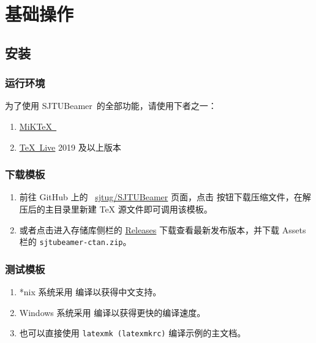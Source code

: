 \documentclass[
    UTF8,
    heading=true,
    12pt,
    a4paper
]{ctexrep}
\def\themename{\textsf{SJTUBeamer}}
\begin{document}
    \part{基础操作}
    \chapter{安装}

    \section{运行环境}

    为了使用 \themename\ 的全部功能，请使用下者之一：
    \begin{enumerate}
        \item \href{https://miktex.org/}{MiK\TeX\ }
        \item \href{https://mirrors.sjtug.sjtu.edu.cn/ctan/systems/texlive/Images/texlive2021-20210325.iso}{\TeX\ Live} 2019 及以上版本
    \end{enumerate}

    \section{下载模板}

    \begin{enumerate}
        \item 前往 GitHub 上的 \faGithub{}~\href{https://github.com/sjtug/SJTUBeamer}{sjtug/SJTUBeamer} 页面，点击  按钮下载压缩文件，在解压后的主目录里新建 \TeX{} 源文件即可调用该模板。
        \item 或者点击进入存储库侧栏的 \href{https://github.com/sjtug/SJTUBeamer/releases}{\textsf{Releases}} 下载查看最新发布版本，并下载 \textsf{Assets} 栏的 \texttt{sjtubeamer-ctan.zip}。
    \end{enumerate}
    
    \section{测试模板}

    \begin{enumerate}
        \item[ \faApple\ \faLinux] *nix 系统采用  编译以获得中文支持。
        \item[ \faWindows] Windows 系统采用  编译以获得更快的编译速度。
        \item[\faWrench] 也可以直接使用 \texttt{latexmk (latexmkrc)} 编译示例的主文档。 
    \end{enumerate}
\end{document}
